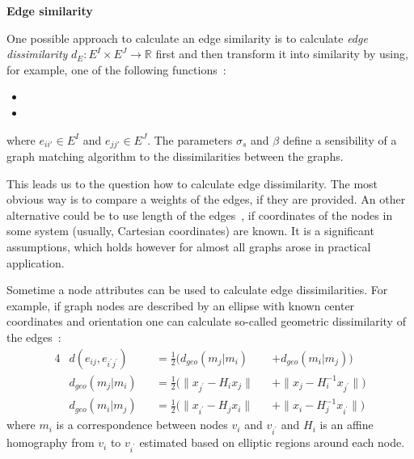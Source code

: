 \textbf{Edge similarity}

One possible approach to calculate an edge similarity is to calculate \emph{edge dissimilarity} $d_E:E^I\times E^J\rightarrow\mathbb{R}$ first and then transform it into similarity by using, for example, one of the following functions~\cite{Cho2014_Haystack, Cho2009_AgglClustering, Cho2010_RRWM,Cho2012_ProgressiveGM}:
\begin{itemize}
	\item {}
	\item {}
\end{itemize}
where $e_{ii\prime}\in E^I$ and $e_{jj\prime}\in E^J$. The parameters $\sigma_s$ and $\beta$ define a sensibility of a graph matching algorithm to the dissimilarities between the graphs.

This leads us to the question how to calculate edge dissimilarity. The most obvious way is to compare a weights of the edges, if they are provided. An other alternative could be to use length of the edges~\cite{Cho2014_Haystack, Cho2009_AgglClustering, Cho2010_RRWM,Cho2012_ProgressiveGM}, if coordinates of the nodes in some system (usually, Cartesian coordinates) are known. It is a significant assumptions, which holds however for almost all graphs arose in practical application.

Sometime a node attributes can be used to calculate edge dissimilarities. For example, if graph nodes are described by an ellipse with known center coordinates and orientation one can calculate so-called geometric dissimilarity of the edges~\cite{Cho2009_AgglClustering,Cho2012_ProgressiveGM}:
\begin{alignat}{4}\label{eq:geomDiss}
& d(e_{ij},e_{i^\prime j^\prime}) && =\frac{1}{2}(d_{geo}(m_j|m_i) && +d_{geo}(m_i|m_j)) \\
& d_{geo}(m_j|m_i) && =\frac{1}{2}(\|x_{j^\prime}-H_{i}x_j\| && + \|x_{j}-H^{-1}_ix_{j^\prime}\|) \\
& d_{geo}(m_i|m_j) && =\frac{1}{2}(\|x_{i^\prime}-H_{j}x_i\| && + \|x_{i}-H^{-1}_{j}x_{i^\prime}\|) 
\end{alignat}
where $m_i$ is a correspondence between nodes $v_i$ and $v_{i^\prime}$ and $H_i$ is an affine homography from $v_i$ to $v_{i^\prime}$ estimated based on elliptic regions around each node.

